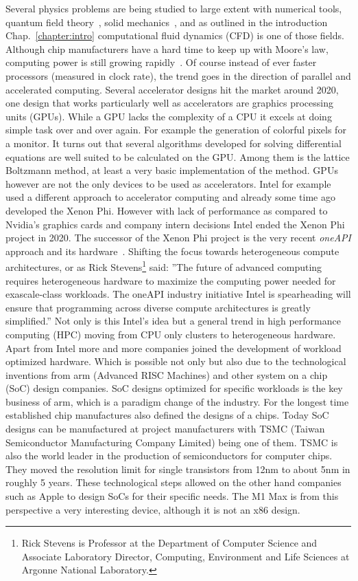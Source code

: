 Several physics problems are being studied to large extent with numerical tools, quantum field theory~\cite{montvayQuantumFieldsLattice1994}, solid mechanics~\cite{cardiffThirtyYearsFinite2021}, and as outlined in the introduction Chap.~\ref{chapter:intro} computational fluid dynamics (CFD) is one of those fields.
Although chip manufacturers have a hard time to keep up with Moore's law, computing power is still growing rapidly~\cite{schallerMooreLawPresent1997}.
Of course instead of ever faster processors (measured in clock rate), the trend goes in the direction of parallel and accelerated computing. 
Several accelerator designs hit the market around 2020, one design that works particularly well as accelerators are graphics processing units (GPUs).
While a GPU lacks the complexity of a CPU it excels at doing simple task over and over again.
For example the generation of colorful pixels for a monitor.
It turns out that several algorithms developed for solving differential equations are well suited to be calculated on the GPU. 
Among them is the lattice Boltzmann method, at least a very basic implementation of the method.
GPUs however are not the only devices to be used as accelerators.
Intel for example used a different approach to accelerator computing and already some time ago developed the Xenon Phi.
However with lack of performance as compared to Nvidia's graphics cards and company intern decisions Intel ended the Xenon Phi project in 2020.
The successor of the Xenon Phi project is the very recent \textit{oneAPI} approach and its hardware~\cite{christgauPortingLegacyCUDA2020}.
Shifting the focus towards heterogeneous compute architectures, or as Rick Stevens\footnote{Rick Stevens is Professor at the Department of Computer Science and Associate Laboratory Director, Computing, Environment and Life Sciences at Argonne National Laboratory.} said: ''The future of advanced computing requires heterogeneous hardware to maximize the computing power needed for exascale-class workloads. The oneAPI industry initiative Intel is spearheading will ensure that programming across diverse compute architectures is greatly simplified.''
Not only is this Intel's idea but a general trend in high performance computing (HPC) moving from CPU only clusters to heterogeneous hardware.
Apart from Intel more and more companies joined the development of workload optimized hardware.
Which is possible not only but also due to the technological inventions from arm (Advanced RISC Machines) and other system on a chip (SoC) design companies.
SoC designs optimized for specific workloads is the key business of arm, which is a paradigm change of the industry.
For the longest time established chip manufactures also defined the designs of a chips.
Today SoC designs can be manufactured at project manufacturers with TSMC (Taiwan Semiconductor Manufacturing Company Limited) being one of them.
TSMC is also the world leader in the production of semiconductors for computer chips. 
They moved the resolution limit for single transistors from 12nm to about 5nm in roughly 5 years.
These technological steps allowed on the other hand companies such as Apple to design SoCs for their specific needs. 
The M1 Max is from this perspective a very interesting device, although it is not an x86 design. 

